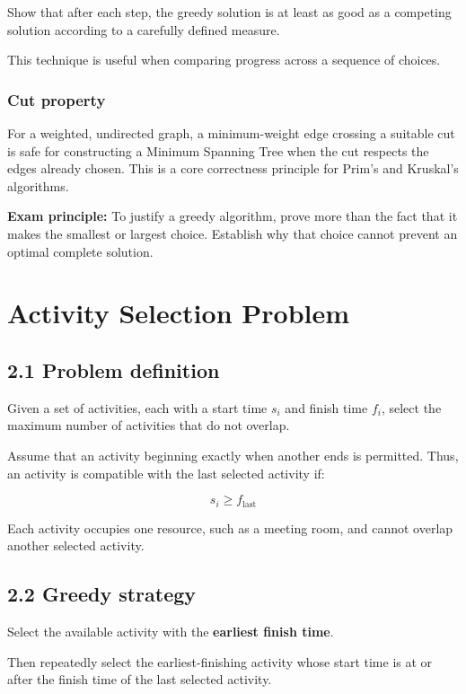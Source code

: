 Show that after each step, the greedy solution is at least as good as a competing solution according to a carefully defined measure.

This technique is useful when comparing progress across a sequence of choices.

\subsubsection{Cut property}

For a weighted, undirected graph, a minimum-weight edge crossing a suitable cut is safe for constructing a Minimum Spanning Tree when the cut respects the edges already chosen. This is a core correctness principle for Prim's and Kruskal's algorithms.

\textbf{Exam principle:} To justify a greedy algorithm, prove more than the fact that it makes the smallest or largest choice. Establish why that choice cannot prevent an optimal complete solution.

\section{Activity Selection Problem}

\subsection{2.1 Problem definition}

Given a set of activities, each with a start time $s_i$ and finish time $f_i$, select the maximum number of activities that do not overlap.

Assume that an activity beginning exactly when another ends is permitted. Thus, an activity is compatible with the last selected activity if:


\[
s_i\geq f_{\text{last}}
\]


Each activity occupies one resource, such as a meeting room, and cannot overlap another selected activity.

\subsection{2.2 Greedy strategy}

Select the available activity with the \textbf{earliest finish time}.

Then repeatedly select the earliest-finishing activity whose start time is at or after the finish time of the last selected activity.

